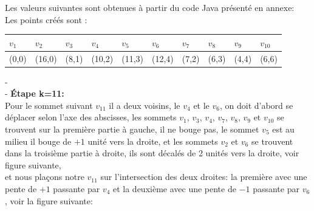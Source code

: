 \documentclass[hidelinks,letterpaper,12pt]{article}
\begin{document}
Les valeurs suivantes sont obtenues à partir du code Java présenté en annexe: \\
Les points créés sont :\\
\begin{tabularx}{\textwidth}{|*{10}{X|}}
\hline
$v_1$ & $v_2$  & $v_3$ & $v_4$  & $v_5$  & $v_6$  & $v_7$ & $v_8$ & $v_9$ & $v_{10}$ \\
\hline
(0,0) & (16,0) & (8,1) & (10,2) & (11,3) & (12,4) & (7,2) & (6,3) & (4,4) & (6,6) \\
\hline
\end{tabularx}
{\color{white}-}
\\
{\color{white}-}
\textbf{Étape k=11:}
\\
Pour le sommet suivant $v_{11}$ il a deux voisins, le $v_4$ et le $v_6$, 
on doit d'abord se déplacer selon l'axe des abscisses, 
les sommets $v_1$, $v_3$, $v_4$, $v_7$, $v_8$, $v_9$ et $v_{10}$ se trouvent sur la première partie à gauche, il ne bouge pas, 
le sommet $v_5$ est au milieu il bouge de $+1$ unité vers la droite,
et les sommets $v_2$ et $v_6$ se trouvent dans la troisième partie à droite, ils sont décalés de 2 unités vers la droite, voir figure suivante, \\
et nous plaçons notre $v_{11}$ sur l'intersection des deux droites: la première avec une pente de $+1$ passante par $v_4$ et la deuxième avec une pente de $-1$ passante par $v_6$, voir la figure suivante:
\end{document}
